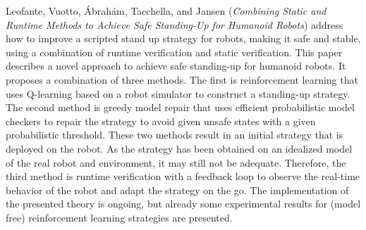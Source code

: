 

Leofante, Vuotto, \'{A}brah\'{a}m, Tacchella, and Jansen
\cite{isola-2016-leofante}
({\em Combining Static and Runtime Methods to Achieve 
      Safe Standing-Up for Humanoid Robots})
address how to improve a scripted stand up strategy for robots, making
it safe and stable, using a combination of runtime verification 
and static verification. 
This paper describes a novel approach to achieve safe standing-up for humanoid robots. It proposes a combination of three methods. The first is reinforcement learning that uses Q-learning based on a robot simulator to construct a standing-up strategy. The second method is greedy model repair that uses efficient probabilistic model checkers to repair the strategy to avoid given unsafe states with a given probabilistic threshold. These two methods result in an initial strategy that is deployed on the robot. As the strategy has been obtained on an idealized model of the real robot and environment, it may still not be adequate. Therefore, the third method is runtime verification with a feedback loop to observe the real-time behavior of the robot and adapt the strategy on the go. 
The implementation of the presented theory is
ongoing, but already some experimental results for (model free)
reinforcement learning strategies are presented.

